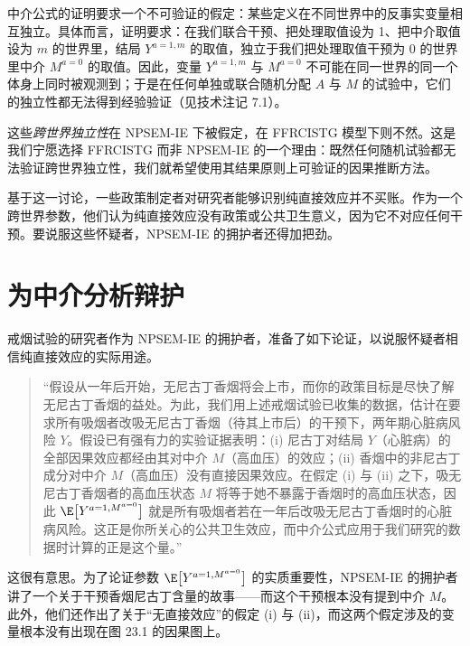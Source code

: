 中介公式的证明要求一个不可验证的假定：某些定义在不同世界中的反事实变量相互独立。具体而言，证明要求：在我们联合干预、把处理取值设为 1、把中介取值设为 $m$ 的世界里，结局 $Y^{a=1,m}$ 的取值，独立于我们把处理取值干预为 0 的世界里中介 $M^{a=0}$ 的取值。因此，变量 $Y^{a=1,m}$ 与 $M^{a=0}$ 不可能在同一世界的同一个体身上同时被观测到；于是在任何单独或联合随机分配 $A$ 与 $M$ 的试验中，它们的独立性都无法得到经验验证（见技术注记 7.1）。

这些\emph{跨世界独立性}在 NPSEM-IE 下被假定，在 FFRCISTG 模型下则不然。这是我们宁愿选择 FFRCISTG 而非 NPSEM-IE 的一个理由：既然任何随机试验都无法验证跨世界独立性，我们就希望使用其结果原则上可验证的因果推断方法。

基于这一讨论，一些政策制定者对研究者能够识别纯直接效应并不买账。作为一个跨世界参数，他们认为纯直接效应没有政策或公共卫生意义，因为它不对应任何干预。要说服这些怀疑者，NPSEM-IE 的拥护者还得加把劲。

\section{为中介分析辩护}

戒烟试验的研究者作为 NPSEM-IE 的拥护者，准备了如下论证，以说服怀疑者相信纯直接效应的实际用途。

\begin{quote}
“假设从一年后开始，无尼古丁香烟将会上市，而你的政策目标是尽快了解无尼古丁香烟的益处。为此，我们用上述戒烟试验已收集的数据，估计在要求所有吸烟者改吸无尼古丁香烟（待其上市后）的干预下，两年期心脏病风险 $Y$。假设已有强有力的实验证据表明：(i) 尼古丁对结局 $Y$（心脏病）的全部因果效应都经由其对中介 $M$（高血压）的效应；(ii) 香烟中的非尼古丁成分对中介 $M$（高血压）没有直接因果效应。在假定 (i) 与 (ii) 之下，吸无尼古丁香烟者的高血压状态 $M$ 将等于她不暴露于香烟时的高血压状态，因此 $\E\big[Y^{a=1,M^{a=0}}\big]$ 就是所有吸烟者若在一年后改吸无尼古丁香烟时的心脏病风险。这正是你所关心的公共卫生效应，而中介公式应用于我们研究的数据时计算的正是这个量。”
\end{quote}

这很有意思。为了论证参数 $\E\big[Y^{a=1,M^{a=0}}\big]$ 的实质重要性，NPSEM-IE 的拥护者讲了一个关于干预香烟尼古丁含量的故事——而这个干预根本没有提到中介 $M$。此外，他们还作出了关于“无直接效应”的假定 (i) 与 (ii)，而这两个假定涉及的变量根本没有出现在图 23.1 的因果图上。

